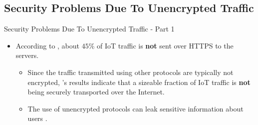 \documentclass[10pt]{beamer}
\begin{document}
\subsection{Security Problems Due To Unencrypted Traffic}
\begin{frame}{Security Problems Due To Unencrypted Traffic - Part 1}

\begin{itemize}
\justifying

\item According to \citet{ITPAReport}, about $45\%$ of IoT traffic is \textbf{not} sent over HTTPS to the servers. 

\begin{itemize}
\justifying
\item Since the traffic transmitted using other protocols are typically not encrypted, \citet{ITPAReport}'s results indicate that a sizeable fraction of IoT traffic is \textbf{not} being securely transported over the Internet.
\end{itemize}

\begin{itemize}
\item The use of unencrypted protocols can leak sensitive information about users \cite{mazhar2020characterizing}.
\end{itemize}

\end{itemize}


\end{frame} 
\end{document}
